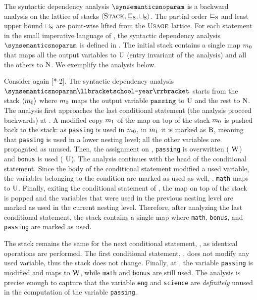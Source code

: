 The syntactic dependency analysis $\synsemanticsnoparam$ is a backward analysis on the lattice of stacks $\langle\textsc{Stack}, \sqsubseteq_{\textsc{S}},\sqcup_{\textsc{S}}\rangle$. The partial order $\sqsubseteq_{\textsc{S}}$ and least upper bound $\sqcup_{\textsc{S}}$ are point-wise lifted from the $\textsc{Usage}$ lattice. For each statement in the small imperative language of , the syntactic dependency analysis $\synsemanticsnoparam$ is defined in .
The initial stack contains a single map $m_0$ that maps all the output variables to $\textup{U}$ (entry invariant of the analysis) and all the others to $\textup{N}$.
We exemplify the analysis below.

\begin{example}
  Consider again [*-2]. The syntactic dependency analysis $\synsemanticsnoparam\semanticsof{\texttt{school-year}}$ starts from the stack $\langle m_0 \rangle$ where $m_0$ maps the output variable $\texttt{passing}$ to $\textup{U}$ and the rest to $\textup{N}$.
  The analysis first approaches the last conditional statement (the analysis proceed backwards) at .
  A modified copy $m_1$ of the map on top of the stack $m_0$ is pushed back to the stack:
  as \texttt{passing} is used in $m_0$, in $m_1$ it is marked as $\textup{B}$, meaning that \texttt{passing} is used in a lower nesting level; all the other variables are propagated as unused.
  Then, the assignment on , \texttt{passing} is overwritten (\cf{} $\textup{W}$) and \texttt{bonus} is used (\cf{} $\textup{U}$).
  The analysis continues with the head of the conditional statement.
  Since the body of the conditional statement modified a used variable, the variables belonging to the condition are marked as used as well, \ie, \texttt{math} maps to $\textup{U}$.
  Finally, exiting the conditional statement of , the map on top of the stack is popped and the variables that were used in the previous nesting level are marked as used in the current nesting level.
  Therefore, after analyzing the last conditional statement, the stack contains a single map where \texttt{math}, \texttt{bonus}, and \texttt{passing} are marked as used.

  The stack remains the same for the next conditional statement, , as identical operations are performed.
  The first conditional statement, \cf{} , does not modify any used variable, thus the stack does not change.
  Finally, at , the variable \texttt{passing} is modified and maps to $\textup{W}$, while \texttt{math} and \texttt{bonus} are still used.
  The analysis is precise enough to capture that the variable \texttt{eng} and \texttt{science} are \emph{definitely} unused in the computation of the variable \texttt{passing}.
\end{example}

